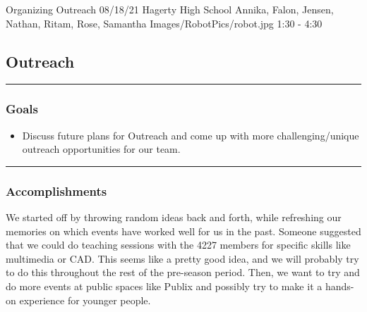 \insertmeeting 
	{Organizing Outreach} 
	{08/18/21}
	{Hagerty High School}
	{Annika, Falon, Jensen, Nathan, Ritam, Rose, Samantha}
	{Images/RobotPics/robot.jpg}
	{1:30 - 4:30}
	
\subsection*{Outreach}
\noindent\hfil\rule{\textwidth}{.4pt}\hfil
\subsubsection*{Goals}
\begin{itemize}
    \item Discuss future plans for Outreach and come up with more challenging/unique outreach opportunities for our team.  

\end{itemize} 

\noindent\hfil\rule{\textwidth}{.4pt}\hfil

\subsubsection*{Accomplishments}
We started off by throwing random ideas back and forth, while refreshing our memories on which events have worked well for us in the past. Someone suggested that we could do teaching sessions with the 4227 members for specific skills like multimedia or CAD. This seems like a pretty good idea, and we will probably try to do this throughout the rest of the pre-season period. Then, we want to try and do more events at public spaces like Publix and possibly try to make it a hands-on experience for younger people.

